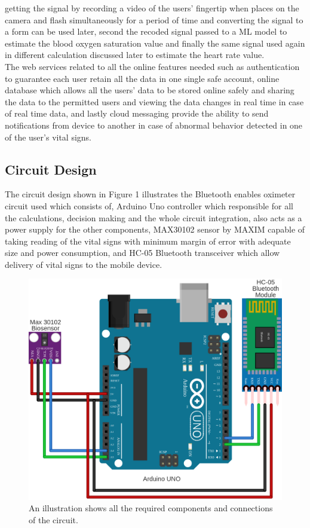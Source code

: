 \documentclass{bmcart}
\begin{document}
getting the signal by recording a video of the users' fingertip when places on
the camera and flash simultaneously for a period of time and converting the
signal to a form can be used later, second the recoded signal passed to a ML
model to estimate the blood oxygen saturation value and finally the same signal
used again in different calculation discussed later to estimate the heart rate
value.\\
The web services related to all the online features needed such as
authentication to  guarantee each user retain all the data in one single safe
account, online database which allows all the users' data to be stored online
safely and sharing the data to the permitted users and viewing the data changes
in real time in case of real time data, and  lastly cloud messaging provide the
ability to send notifications from device to another in case of abnormal
behavior detected in one of the user's vital signs.\\

\subsection*{Circuit Design}
The circuit design shown in Figure 1 illustrates the Bluetooth enables oximeter
circuit used which consists of,  Arduino Uno controller which responsible for
all the calculations, decision making and the whole circuit integration, also
acts as a power supply for the other components, MAX30102 sensor by MAXIM
capable of taking reading of the vital signs with minimum margin of error with
adequate size and power consumption, and  HC-05 Bluetooth transceiver which
allow delivery of vital signs to the mobile device.

\begin{figure}[h!]
  \includegraphics[width=.75\linewidth]{png_images/circuit_desing.png}
  \caption{
      An illustration shows all the required components and connections of the
      circuit.}
\end{figure}
\FloatBarrier
\end{document}
